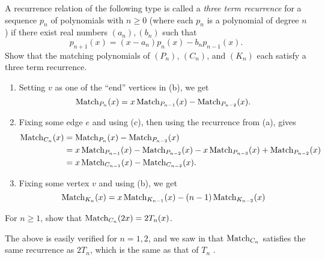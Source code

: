 		\begin{problem}
			\label{problem: three term recurrence matching}
			A recurrence relation of the following type is called a \emph{three term recurrence} for a sequence $p_n$ of polynomials with $n \ge 0$ (where each $p_n$ is a polynomial of degree $n$) if there exist real numbers $(a_n),(b_n)$ such that 
			\[ p_{n+1}(x) = (x-a_n)p_n(x) - b_n p_{n-1}(x). \]
			Show that the matching polynomials of $(P_n)$, $(C_n)$, and $(K_n)$ each satisfy a three term recurrence.
		\end{problem}
		\begin{solution*}
			\begin{enumerate}[label=(\alph*)]
				\item Setting $v$ as one of the ``end'' vertices in (b), we get
				\[ \operatorname{Match}_{P_n}(x) = x\operatorname{Match}_{P_{n-1}}(x) - \operatorname{Match}_{P_{n-2}}(x). \]

				\item Fixing some edge $e$ and using (c), then using the recurrence from (a), gives
				\begin{align*}
					\operatorname{Match}_{C_n}(x) &= \operatorname{Match}_{P_n}(x) - \operatorname{Match}_{P_{n-2}}(x) \\
						&= x\operatorname{Match}_{P_{n-1}}(x) - \operatorname{Match}_{P_{n-2}}(x) - x \operatorname{Match}_{P_{n-3}}(x) + \operatorname{Match}_{P_{n-2}}(x) \\
						&= x\operatorname{Match}_{C_{n-1}}(x) - \operatorname{Match}_{C_{n-2}}(x).
				\end{align*}

				\item Fixing some vertex $v$ and using (b), we get
				\[ \operatorname{Match}_{K_n}(x) = x\operatorname{Match}_{K_{n-1}}(x) - (n-1)\operatorname{Match}_{K_{n-2}}(x) \]
			\end{enumerate}
		\end{solution*}


		\begin{problem}
			For $n \ge 1$, show that $\operatorname{Match}_{C_n}(2x) = 2T_n(x)$.
		\end{problem}
		\begin{solution*}
			The above is easily verified for $n=1,2$, and we saw in  that $\operatorname{Match}_{C_n}$ satisfies the same recurrence as $2T_n$, which is the same as that of $T_n$ \Cref{prop: recurrence of Tn}.
		\end{solution*}

